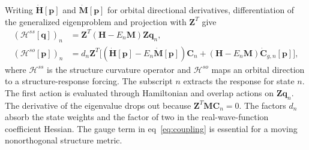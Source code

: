\documentclass[12pt]{article}
\begin{document}
Writing \(\dot{\mathbf H}[\mathbf p]\) and \(\dot{\mathbf M}[\mathbf p]\) for orbital directional derivatives, differentiation of the generalized eigenproblem and projection with \(\mathbf Z^T\) give
\begin{equation}
 \begin{aligned}
 (\mathcal H^{ss}[\mathbf q])_n&=\mathbf Z^T(\mathbf H-E_n\mathbf M)\mathbf Z\mathbf q_n,\\
 (\mathcal H^{so}[\mathbf p])_n&=d_n\mathbf Z^T\big[
 (\dot{\mathbf H}[\mathbf p]-E_n\dot{\mathbf M}[\mathbf p])\mathbf C_n
 +(\mathbf H-E_n\mathbf M)\dot{\mathbf C}_{g,n}[\mathbf p]\big],
 \end{aligned}
 \label{eq:coupling}
\end{equation}
where \(\mathcal H^{ss}\) is the structure curvature operator and \(\mathcal H^{so}\) maps an orbital direction to a structure-response forcing. The subscript \(n\) extracts the response for state \(n\). The first action is evaluated through Hamiltonian and overlap actions on \(\mathbf Z\mathbf q_n\). The derivative of the eigenvalue drops out because \(\mathbf Z^T\mathbf M\mathbf C_n=0\). The factors \(d_n\) absorb the state weights and the factor of two in the real-wave-function coefficient Hessian. The gauge term in eq~\eqref{eq:coupling} is essential for a moving nonorthogonal structure metric.
\end{document}
